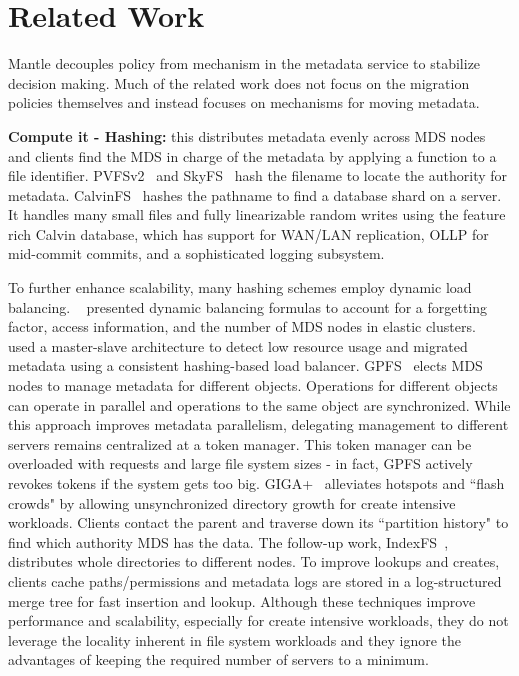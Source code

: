 \section{Related Work}									%
\label{related-work}									%
Mantle decouples policy from mechanism in the metadata service to stabilize decision making. Much of the related work does not focus on the migration policies themselves and instead focuses on mechanisms for moving metadata. 

\textbf{Compute it - Hashing:} this distributes metadata evenly across MDS nodes and clients find the MDS in charge of the metadata by applying a function to a file identifier. PVFSv2~\cite{hildebrand:msst2005-pnfs} and SkyFS~\cite{xing:sc2009-skyfs} hash the filename to locate the authority for metadata. CalvinFS~\cite{thomson:fast2015-calvinfs} hashes the pathname to find a database shard on a server. It handles many small files and fully linearizable random writes using the feature rich Calvin database, which has support for WAN/LAN replication, OLLP for mid-commit commits, and a sophisticated logging subsystem. 

To further enhance scalability, many hashing schemes employ dynamic load balancing. ~\cite{li:msst2006-dynamic} presented dynamic balancing formulas to account for a forgetting factor, access information, and the number of MDS nodes in elastic clusters.~\cite{xing:sc2009-skyfs} used a master-slave architecture to detect low resource usage and migrated metadata using a consistent hashing-based load balancer. GPFS~\cite{schmuck:fast2002-gpfs} elects MDS nodes to manage metadata for different objects. Operations for different objects can operate in parallel and operations to the same object are synchronized. While this approach improves metadata parallelism, delegating management to different servers remains centralized at a token manager. This token manager can be overloaded with requests and large file system sizes - in fact, GPFS actively revokes tokens if the system gets too big. GIGA+~\cite{patil:fast2011-giga+} alleviates hotspots and ``flash crowds" by allowing unsynchronized directory growth for create intensive workloads. Clients contact the parent and traverse down its ``partition history" to find which authority MDS has the data. The follow-up work, IndexFS~\cite{patil:fast2011-giga+}, distributes whole directories to different nodes. To improve lookups and creates, clients cache paths/permissions and metadata logs are stored in a log-structured merge tree for fast insertion and lookup.  Although these techniques improve performance and scalability, especially for create intensive workloads, they do not leverage the locality inherent in file system workloads and they ignore the advantages of keeping the required number of servers to a minimum. 


